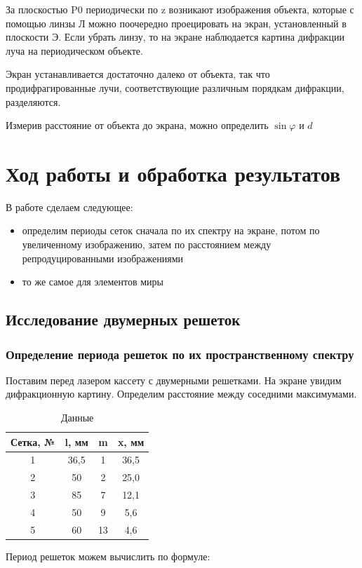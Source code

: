 \documentclass[a4paper, 12pt]{article}
\begin{document}
За плоскостью P0 периодически по z возникают изображения объекта, которые с помощью линзы Л можно поочередно проецировать на экран, установленный в плоскости Э.
Если убрать линзу, то на экране наблюдается картина дифракции луча на периодическом объекте.

Экран устанавливается достаточно далеко от объекта, так что продифрагированные лучи, соответствующие различным порядкам дифракции, разделяются.

Измерив расстояние от объекта до экрана, можно определить $\sin \varphi$ и $d$


\section{Ход работы и обработка результатов}

В работе сделаем следующее:
\begin{itemize}
	\item определим периоды сеток сначала по их спектру на экране, потом по увеличенному изображению, затем по расстоянием между репродуцированными изображениями
	\item то же самое для элементов миры 
\end{itemize}

\subsection{Исследование двумерных решеток}
\subsubsection*{Определение периода решеток по их пространственному спектру}

Поставим перед лазером кассету с двумерными решетками. На экране увидим дифракционную картину. Определим расстояние между соседними максимумами.

\begin{table}[H]
	\centering
	\begin{tabular}{|c|c|c|c|}
	\hline
	\textbf{Сетка, №} & \textbf{l, мм} & \textbf{m} & \textbf{x, мм} \\ \hline
	1                 & 36,5           & 1          & 36,5           \\ \hline
	2                 & 50             & 2          & 25,0           \\ \hline
	3                 & 85             & 7          & 12,1           \\ \hline
	4                 & 50             & 9          & 5,6            \\ \hline
	5                 & 60             & 13         & 4,6            \\ \hline
	\end{tabular}
	\caption{Данные}
	\label{tab:data1}
\end{table}
Период решеток можем вычислить по формуле:
\end{document}
